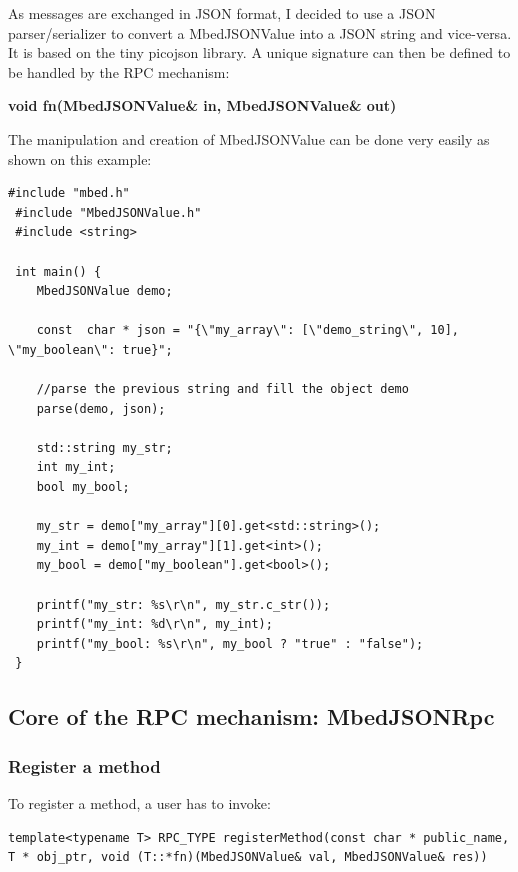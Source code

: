 \documentclass[pdftex,10pt,a4paper]{report}
\begin{document}
As messages are exchanged in JSON format, I decided to use a JSON parser/serializer to convert a MbedJSONValue into a JSON string and vice-versa. It is based on the tiny picojson library. A unique signature can then be defined to be handled by the RPC mechanism:

\begin{center}
\textbf{void fn(MbedJSONValue\& in, MbedJSONValue\& out)}
\end{center}

The manipulation and creation of MbedJSONValue can be done very easily as shown on this example:

\begin{lstlisting}[label=MbedJSONValue manipulation,caption=MbedJSONValue manipulation]
 #include "mbed.h"
 #include "MbedJSONValue.h"
 #include <string>

 int main() {     
    MbedJSONValue demo;

    const  char * json = "{\"my_array\": [\"demo_string\", 10], \"my_boolean\": true}";

    //parse the previous string and fill the object demo
    parse(demo, json);

    std::string my_str;
    int my_int;
    bool my_bool;

    my_str = demo["my_array"][0].get<std::string>();
    my_int = demo["my_array"][1].get<int>();
    my_bool = demo["my_boolean"].get<bool>();
   
    printf("my_str: %s\r\n", my_str.c_str());
    printf("my_int: %d\r\n", my_int);
    printf("my_bool: %s\r\n", my_bool ? "true" : "false");
 }
   \end{lstlisting}

\subsection{Core of the RPC mechanism: MbedJSONRpc}
\subsubsection{Register a method}
To register a method, a user has to invoke:
\begin{lstlisting}[label=Register a method,caption=Register a method]
template<typename T> RPC_TYPE registerMethod(const char * public_name, T * obj_ptr, void (T::*fn)(MbedJSONValue& val, MbedJSONValue& res))
\end{lstlisting}
\end{document}
